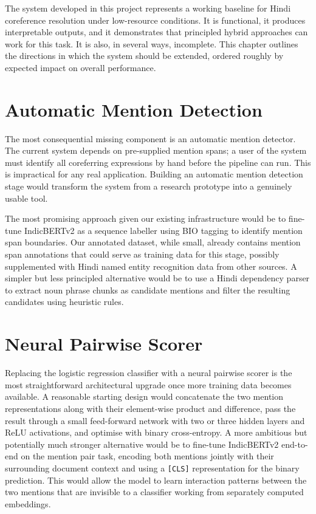 \documentclass[12pt,a4paper]{report}
\begin{document}
The system developed in this project represents a working baseline for Hindi coreference resolution under low-resource conditions. It is functional, it produces interpretable outputs, and it demonstrates that principled hybrid approaches can work for this task. It is also, in several ways, incomplete. This chapter outlines the directions in which the system should be extended, ordered roughly by expected impact on overall performance.

\section{Automatic Mention Detection}

The most consequential missing component is an automatic mention detector. The current system depends on pre-supplied mention spans; a user of the system must identify all coreferring expressions by hand before the pipeline can run. This is impractical for any real application. Building an automatic mention detection stage would transform the system from a research prototype into a genuinely usable tool.

The most promising approach given our existing infrastructure would be to fine-tune IndicBERTv2 as a sequence labeller using BIO tagging to identify mention span boundaries. Our annotated dataset, while small, already contains mention span annotations that could serve as training data for this stage, possibly supplemented with Hindi named entity recognition data from other sources. A simpler but less principled alternative would be to use a Hindi dependency parser to extract noun phrase chunks as candidate mentions and filter the resulting candidates using heuristic rules.

\section{Neural Pairwise Scorer}

Replacing the logistic regression classifier with a neural pairwise scorer is the most straightforward architectural upgrade once more training data becomes available. A reasonable starting design would concatenate the two mention representations along with their element-wise product and difference, pass the result through a small feed-forward network with two or three hidden layers and ReLU activations, and optimise with binary cross-entropy. A more ambitious but potentially much stronger alternative would be to fine-tune IndicBERTv2 end-to-end on the mention pair task, encoding both mentions jointly with their surrounding document context and using a \texttt{[CLS]} representation for the binary prediction. This would allow the model to learn interaction patterns between the two mentions that are invisible to a classifier working from separately computed embeddings.
\end{document}
